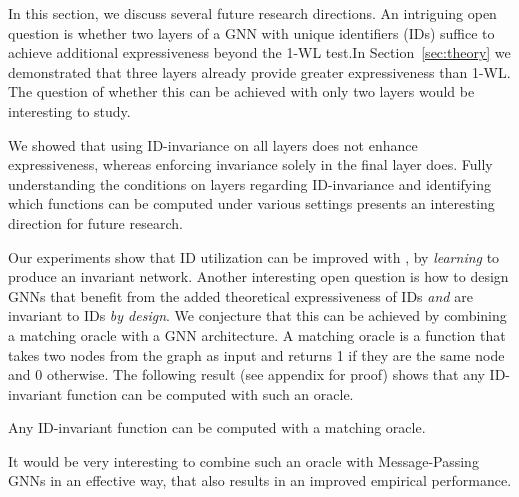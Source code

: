 In this section, we discuss several future research directions. An intriguing open question is whether two layers of a GNN with unique identifiers (IDs) suffice to achieve additional expressiveness beyond the 1-WL test.\newline In Section~\ref{sec:theory} we demonstrated that three layers already provide greater expressiveness than 1-WL. The question of whether this can be achieved with only two layers would be interesting to study.

We showed that using ID-invariance on all layers does not enhance expressiveness, whereas enforcing invariance solely in the final layer does. Fully understanding the conditions on layers regarding ID-invariance and identifying which functions can be computed under various settings presents an interesting direction for future research.


Our experiments show that ID utilization can be improved with {\ourmethod}, by \textit{learning} to produce an invariant network. Another interesting open question is how to design GNNs that benefit from the added theoretical expressiveness of IDs \textit{and} are invariant to IDs \textit{by design}. We conjecture that this can be achieved by combining a matching oracle with a GNN architecture. \newline
A matching oracle is a function that takes two nodes from the graph as input and returns 1 if they are the same node and 0 otherwise. 
The following result (see appendix for proof) shows that any ID-invariant function can be computed with such an oracle. 
\begin{theorem}\label{thm:matching_oracle}
      Any ID-invariant function can be computed with a matching oracle.
\end{theorem}


It would be very interesting to combine such an oracle with Message-Passing GNNs in an effective way, that also results in an improved empirical performance.